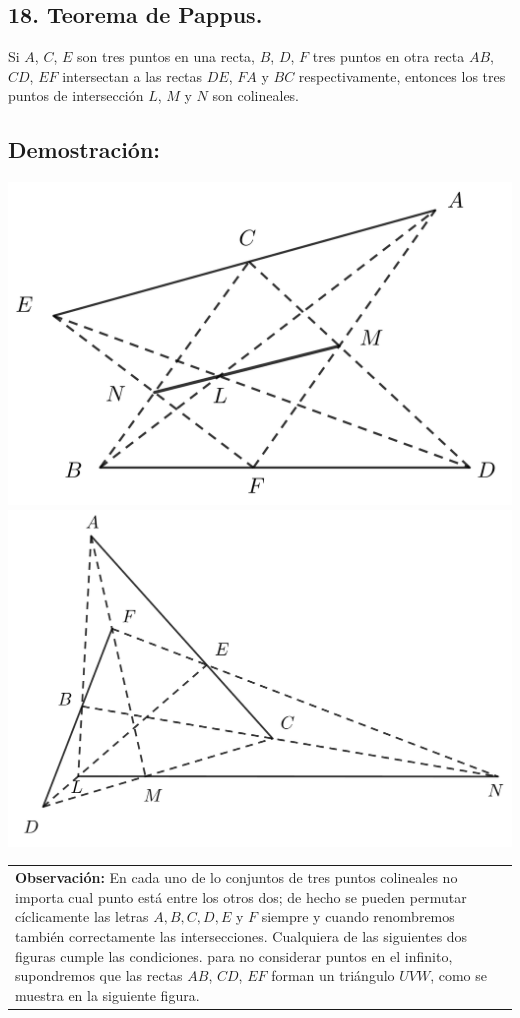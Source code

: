 \documentclass[12pt,a4paper]{article}
\begin{document}
\subsection*{18. Teorema de Pappus.}
Si $A$, $C$, $E$ son tres puntos en una recta, $B$, $D$, $F$ tres puntos en otra recta $AB$, $CD$, $EF$ intersectan a las rectas $DE$, $FA$ y $BC$ respectivamente, entonces los tres puntos de intersección $L$, $M$ y $N$ son colineales.
\subsection*{Demostración:}
\begin{center}
\includegraphics[scale=0.45]{pappus.png} 
\includegraphics[scale=0.45]{pappus1.png} 
\end{center}
\begin{tabular}{p{15.9 cm} p{1cm}}
\textbf{Observación:} En cada uno de lo conjuntos de tres puntos colineales no importa cual punto está entre los otros dos; de hecho se pueden permutar cíclicamente las letras $A, B, C, D, E$ y $F$ siempre y cuando renombremos también  correctamente las intersecciones. Cualquiera de las siguientes dos figuras cumple las condiciones. para no considerar puntos en el infinito, supondremos que las rectas $AB$, $CD$, $EF$ forman un triángulo $UVW$, como se muestra en la siguiente figura.
\end{tabular}
\end{document}
